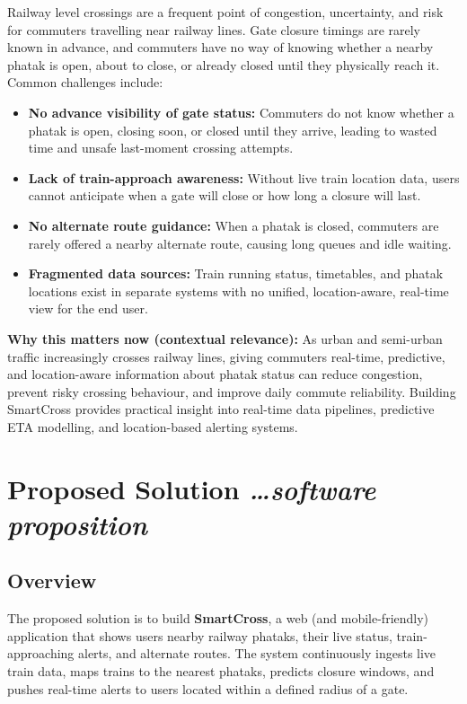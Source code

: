 \documentclass[11pt,a4paper]{article}
\newcommand{\BvrHint}[1]{%
  {\normalfont\normalsize\itshape\hfill #1}}
\begin{document}
Railway level crossings are a frequent point of congestion, uncertainty, and risk for commuters travelling near railway lines. Gate closure timings are rarely known in advance, and commuters have no way of knowing whether a nearby phatak is open, about to close, or already closed until they physically reach it. Common challenges include:

\begin{itemize}
    \item \textbf{No advance visibility of gate status:} Commuters do not know whether a phatak is open, closing soon, or closed until they arrive, leading to wasted time and unsafe last-moment crossing attempts.

    \item \textbf{Lack of train-approach awareness:} Without live train location data, users cannot anticipate when a gate will close or how long a closure will last.

    \item \textbf{No alternate route guidance:} When a phatak is closed, commuters are rarely offered a nearby alternate route, causing long queues and idle waiting.

    \item \textbf{Fragmented data sources:} Train running status, timetables, and phatak locations exist in separate systems with no unified, location-aware, real-time view for the end user.
\end{itemize}

\textbf{Why this matters now (contextual relevance):} As urban and semi-urban traffic increasingly crosses railway lines, giving commuters real-time, predictive, and location-aware information about phatak status can reduce congestion, prevent risky crossing behaviour, and improve daily commute reliability. Building SmartCross provides practical insight into real-time data pipelines, predictive ETA modelling, and location-based alerting systems.

\section{Proposed Solution %
\BvrHint{\ldots software proposition}}

\subsection{Overview}

The proposed solution is to build \textbf{SmartCross}, a web (and mobile-friendly) application that shows users nearby railway phataks, their live status, train-approaching alerts, and alternate routes. The system continuously ingests live train data, maps trains to the nearest phataks, predicts closure windows, and pushes real-time alerts to users located within a defined radius of a gate.
\end{document}
